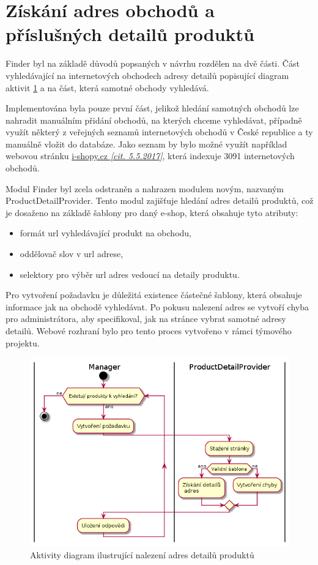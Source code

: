 \documentclass[thesis=B,czech]{FITthesis}[2012/06/26]
\begin{document}
\section{Získání adres obchodů a příslušných detailů produktů}
Finder byl na základě důvodů popsaných v návrhu rozdělen na dvě části. Část vyhledávající na internetových obchodech adresy detailů popisující diagram aktivit \ref{fig:pdp-diagram} a na část, která samotné obchody vyhledává.
\par
Implementována byla pouze první část, jelikož hledání samotných obchodů lze nahradit manuálním přidání obchodů, na kterých chceme vyhledávat, případně využít některý z veřejných seznamů internetových obchodů v České republice a ty manuálně vložit do databáze.
Jako seznam by bylo možné využít například webovou stránku \href{http://www.i-shopy.cz/}{i-shopy.cz \textit{[cit. 5.5.2017]}}, která indexuje 3091 internetových obchodů.
\par
Modul Finder byl zcela odstraněn a nahrazen modulem novým, nazvaným ProductDetailProvider.
Tento modul zajišťuje hledání adres detailů produktů, což je dosaženo na základě šablony pro daný e-shop, která obsahuje 
tyto atributy:
\begin{itemize}
\item formát url vyhledávající produkt na obchodu,
\item oddělovač slov v url adrese,
\item selektory pro výběr url adres vedoucí na detaily produktu.
\end{itemize}
Pro vytvoření požadavku je důležitá existence částečné šablony, která obsahuje informace jak na obchodě vyhledávat.
Po pokusu nalezení adres se vytvoří chyba pro administrátora, aby specifikoval, jak na stránce vybrat samotné adresy detailů. Webové rozhraní
bylo pro tento proces vytvořeno v rámci týmového projektu.

\begin{figure}\centering
 	\includegraphics[width=1.0\textwidth]{resources/pdp-activity}
	\caption[Aktivity diagram ilustrující nalezení adres detailů produktů]{
	Aktivity diagram ilustrující nalezení adres detailů produktů}\label{fig:pdp-diagram}
\end{figure}
\end{document}
